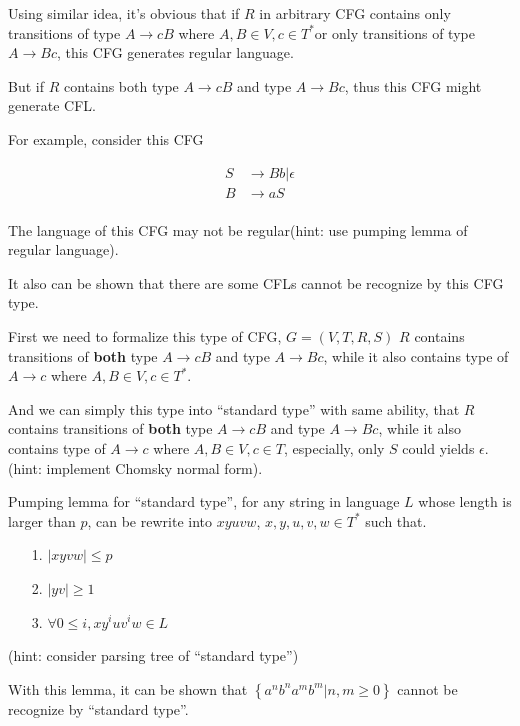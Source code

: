 \documentclass{article}
\begin{document}
\begin{itemize}
            Using similar idea, it's obvious that if $R$ in arbitrary CFG contains only transitions of type $A \rightarrow cB$ where $A, B \in V, c \in T^{*}$or only transitions of type $A \rightarrow Bc$, this CFG generates regular language.

            But if $R$ contains both type $A \rightarrow cB$ and type $A \rightarrow Bc$, thus this CFG might generate CFL.
            
            For example, consider this CFG
            
            \begin{align*}
                S & \rightarrow Bb | \epsilon \\
                B & \rightarrow aS\\
            \end{align*}

            The language of this CFG may not be regular(hint: use pumping lemma of regular language). 

            It also can be shown that there are some CFLs cannot be recognize by this CFG type.

            First we need to formalize this type of CFG, $G = (V, T, R, S)$
            $R$ contains transitions of \textbf{both} type $A \rightarrow cB$ and type $A \rightarrow Bc$, while it also contains type of $A \rightarrow c$ where $A,B \in V, c \in T^{*}$. 
            
            And we can simply this type into ``standard type'' with same ability, that $R$ contains transitions of \textbf{both} type $A \rightarrow cB$ and type $A \rightarrow Bc$, while it also contains type of $A \rightarrow c$ where $A,B \in V,c \in T$, especially, only $S$ could yields $\epsilon$. (hint: implement Chomsky normal form).
            
            Pumping lemma for ``standard type'', for any string in language $L$ whose length is larger than $p$, can be rewrite into $xyuvw$, $x, y, u, v, w \in T^{*}$ such that.

            \begin{itemize}
                \item[1.] $|xyvw| \leq p$
                \item[2.] $|yv| \geq 1$
                \item[3.] $\forall 0 \leq i,xy^{i}uv^{i}w \in L$  
            \end{itemize}
            (hint: consider parsing tree of ``standard type'')
            
            With this lemma, it can be shown that $\left\{ a^{n}b^{n}a^{m}b^{m} | n,m \geq 0 \right\}$ cannot be recognize by ``standard type''.

    \end{itemize}

   
    
    
    
    

    
\end{document}
